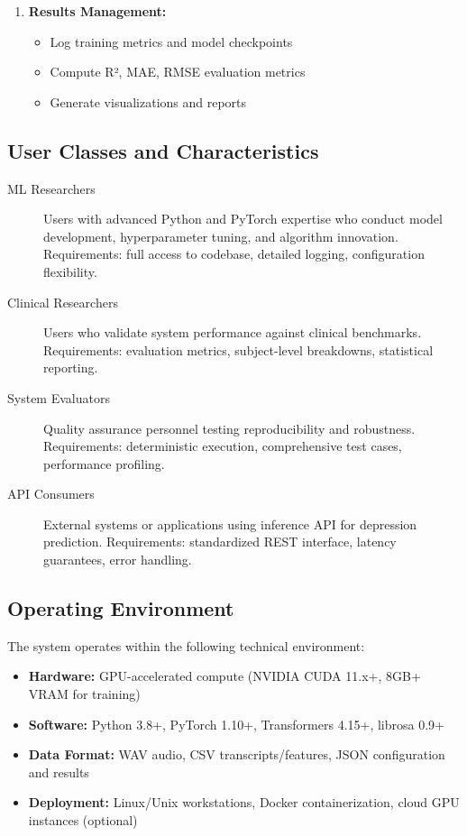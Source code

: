 \documentclass[12pt]{article}
\begin{document}
\begin{enumerate}
		\item \textbf{Results Management:}
		\begin{itemize}
			\item Log training metrics and model checkpoints
			\item Compute R², MAE, RMSE evaluation metrics
			\item Generate visualizations and reports
		\end{itemize}
	\end{enumerate}

	\subsection{User Classes and Characteristics}

	\begin{description}
		\item[ML Researchers] Users with advanced Python and PyTorch expertise who conduct model development, hyperparameter tuning, and algorithm innovation. Requirements: full access to codebase, detailed logging, configuration flexibility.

		\item[Clinical Researchers] Users who validate system performance against clinical benchmarks. Requirements: evaluation metrics, subject-level breakdowns, statistical reporting.

		\item[System Evaluators] Quality assurance personnel testing reproducibility and robustness. Requirements: deterministic execution, comprehensive test cases, performance profiling.

		\item[API Consumers] External systems or applications using inference API for depression prediction. Requirements: standardized REST interface, latency guarantees, error handling.
	\end{description}

	\subsection{Operating Environment}

	The system operates within the following technical environment:

	\begin{itemize}
		\item \textbf{Hardware:} GPU-accelerated compute (NVIDIA CUDA 11.x+, 8GB+ VRAM for training)
		\item \textbf{Software:} Python 3.8+, PyTorch 1.10+, Transformers 4.15+, librosa 0.9+
		\item \textbf{Data Format:} WAV audio, CSV transcripts/features, JSON configuration and results
		\item \textbf{Deployment:} Linux/Unix workstations, Docker containerization, cloud GPU instances (optional)
	\end{itemize}
\end{document}
